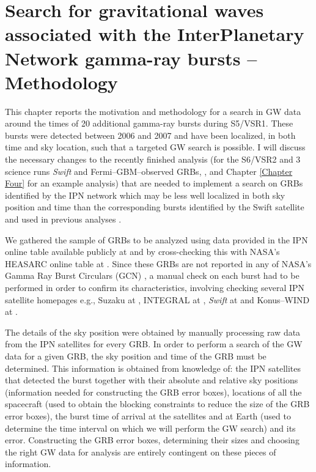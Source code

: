 \chapter{Search for gravitational waves associated with the InterPlanetary Network gamma-ray bursts -- Methodology} %
\label{Chapter Six}

This chapter reports the motivation and methodology for a search in GW data around the times of 20 additional gamma-ray bursts during S5/VSR1. These bursts were detected between 2006 and 2007 and have been localized, in both time and sky location, such that a targeted GW search is possible. I will discuss the necessary changes to the recently finished analysis (for the S6/VSR2 and 3 science runs \emph{Swift} and Fermi--GBM--observed GRBs, \cite{lvc:s6grb, Harry:2010fr}, and Chapter \ref{Chapter Four} for an example analysis) that are needed to implement a search on GRBs identified by the IPN network which may be less well localized in both sky position and time than the corresponding bursts identified by the Swift satellite and used in previous analyses \cite{Abadie:2010uf, Collaboration:2009kk}.

We gathered the sample of GRBs to be analyzed using data provided in the IPN online table available publicly at \cite{HurleyHTML} and by cross-checking this with NASA's HEASARC online table at \cite{heasarc}. Since these GRBs are not reported in any of NASA's Gamma Ray Burst Circulars (GCN) \cite{gcns}, a manual check on each burst had to be performed in order to confirm its characteristics, involving checking several IPN satellite homepages e.g., Suzaku at \cite{suzaku}, INTEGRAL at \cite{integral}, \emph{Swift} at \cite{swift} and Konus--WIND at \cite{konus}.

The details of the sky position were obtained by manually processing raw data from the IPN satellites for every GRB.  In order to perform a search of the GW data for a given GRB, the sky position and time of the GRB must be determined.  This information is obtained from knowledge of: the IPN satellites that detected the burst together with their absolute and relative sky positions (information needed for constructing the GRB error boxes), locations of all the spacecraft (used to obtain the blocking constraints to reduce the size of the GRB error boxes), the burst time of arrival at the satellites and at Earth (used to determine the time interval on which we will perform the GW search) and its error. Constructing the GRB error boxes, determining their sizes and choosing the right GW data for analysis are entirely contingent on these pieces of information.

